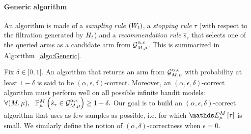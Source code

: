 \begin{figure}
\vspace{-15pt}
\vspace{-15pt}
\end{figure}

\paragraph{Generic algorithm}  An algorithm is made of a
\emph{sampling rule} $(W_t)$, a \emph{stopping rule} $\tau$ (with
respect to the filtration generated by $H_t$) and a \emph{recommendation rule}
$\hat{s}_\tau$ that selects one of the queried arms as a candidate arm from
$\mathcal{G}_{M,\mu}^{\alpha,\epsilon}$. This is summarized in
Algorithm~\ref{algo:Generic}.


Fix $\delta \in ]0,1[$.
An algorithm that returns an arm from $\mathcal{G}_{M,\mu}^{\alpha,\epsilon}$
with probability at least $1-\delta$ is said to be
$(\alpha,\epsilon,\delta)$-correct.
Moreover, an $(\alpha,\epsilon,\delta)$-correct algorithm must perform
well on
all possible infinite bandit models:
$
\forall (M, \mu), \ \
\mathbb{P}_{\mu}^M\left(  \hat{s}_\tau \in \mathcal{G}_{M,\mu}^{\alpha,\epsilon}  \right)
	\geq 1 - \delta.
$
Our
goal is to build an $(\alpha,\epsilon,\delta)$-correct algorithm that uses as
few
samples as possible, i.e. for which $\ETrueModel{\tau}$ is small.
We similarly define the notion of $(\alpha,\delta)$-correctness
when
$\epsilon=0$.


